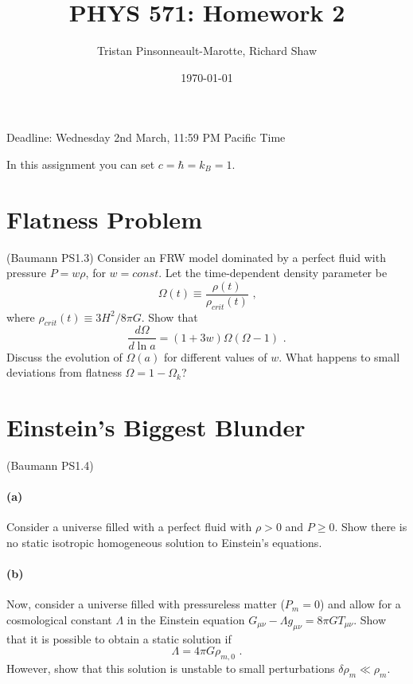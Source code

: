 \documentclass[12pt]{article}
\author{Tristan Pinsonneault-Marotte, Richard Shaw}
\title{PHYS 571: Homework 2}
\date{\today}
\begin{document}
\maketitle

Deadline: Wednesday 2nd March, 11:59 PM Pacific Time

In this assignment you can set $c = \hbar = k_B = 1$.

\section{Flatness Problem}

(Baumann PS1.3) Consider an FRW model dominated by a perfect fluid with pressure
$P = w\rho$, for $w = const$. Let the time-dependent density parameter be
\begin{equation}
    \Omega(t) \equiv \frac{\rho(t)}{\rho_{crit}(t)} \text{ ,}
\end{equation}
where $\rho_{crit}(t) \equiv 3 H^2 / 8 \pi G$. Show that
\begin{equation}
    \frac{d \Omega}{d \ln a} = \left(1 +  3w\right) \Omega
    \left(\Omega - 1\right) \text{ .}
\end{equation}
Discuss the evolution of $\Omega(a)$ for different values of $w$. What happens
to small deviations from flatness $\Omega = 1 - \Omega_k$?


\section{Einstein's Biggest Blunder}

(Baumann PS1.4)

\paragraph{(a)} Consider a universe filled with a perfect fluid with $\rho > 0$
and $P \geq 0$. Show there is no static isotropic homogeneous solution to
Einstein's equations.

\paragraph{(b)} Now, consider a universe filled with pressureless matter ($P_m =
0$) and allow for a cosmological constant $\Lambda$ in the Einstein equation
$G_{\mu\nu} - \Lambda g_{\mu\nu} = 8\pi G T_{\mu\nu}$. Show that it is possible to obtain a static solution if
\begin{equation}
    \Lambda = 4 \pi G \rho_{m,0} \text{ .}
\end{equation}
However, show that this solution is unstable to small perturbations $\delta
\rho_m \ll \rho_m$.
\end{document}
